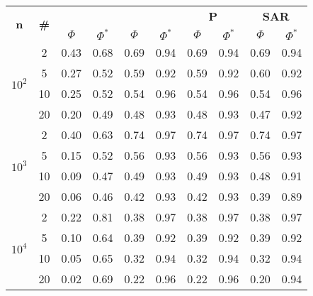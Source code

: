 \begin{table}
\begin{small}
		\bigskip
		\begin{tabular}{|c|c|cc|cc|cc|cc|}
			\hline
			\multirow{2}{*}{\textbf{n}} &
			\multirow{2}{*}{\textbf{\#}} &
			\multicolumn{2}{c|}{\textbf{\astar}} &
			\multicolumn{2}{c|}{\textbf{\ambush}} &
			\multicolumn{2}{c|}{\textbf{P}} &
			\multicolumn{2}{c|}{\textbf{SAR}}\\
			& & $\Phi$ & $\Phi^*$ & $\Phi$ & $\Phi^*$&
			$\Phi$ & $\Phi^*$& $\Phi$ & $\Phi^*$\\
			\hline
			\multirow{4}{*}{$10^2$}
			 & 2 & 0.43 & 0.68 & 0.69 & 0.94 & 0.69 & 0.94 & 0.69 & 0.94\\
			 & 5 & 0.27 & 0.52 & 0.59 & 0.92 & 0.59 & 0.92 & 0.60 & 0.92\\
			 & 10 & 0.25 & 0.52 & 0.54 & 0.96 & 0.54 & 0.96 & 0.54 & 0.96\\
			 & 20 & 0.20 & 0.49 & 0.48 & 0.93 & 0.48 & 0.93 & 0.47 & 0.92\\
			\hline
			\multirow{4}{*}{$10^3$}
			 & 2 & 0.40 & 0.63 & 0.74 & 0.97 & 0.74 & 0.97 & 0.74 & 0.97\\
			 & 5 & 0.15 & 0.52 & 0.56 & 0.93 & 0.56 & 0.93 & 0.56 & 0.93\\
			 & 10 & 0.09 & 0.47 & 0.49 & 0.93 & 0.49 & 0.93 & 0.48 & 0.91\\
			 & 20 & 0.06 & 0.46 & 0.42 & 0.93 & 0.42 & 0.93 & 0.39 & 0.89\\
			 \hline
			\multirow{4}{*}{$10^4$}
			 & 2 & 0.22 & 0.81 & 0.38 & 0.97 & 0.38 & 0.97 & 0.38 & 0.97\\
			 & 5 & 0.10 & 0.64 & 0.39 & 0.92 & 0.39 & 0.92 & 0.39 & 0.92\\
			 & 10 & 0.05 & 0.65 & 0.32 & 0.94 & 0.32 & 0.94 & 0.32 & 0.94\\
			 & 20 & 0.02 & 0.69 & 0.22 & 0.96 & 0.22 & 0.96 & 0.20 & 0.94\\
			 \hline
		\end{tabular}
	\end{small}
\end{table}
